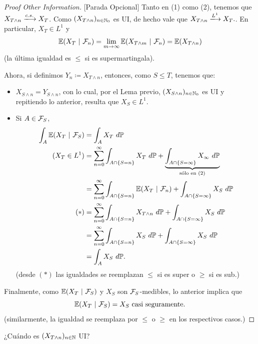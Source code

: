 \begin{proof}[Proof Other Information][Parada Opcional]
	Tanto en (1) como (2), tenemos que $X_{T \wedge n} \xlongrightarrow{c.s.} X_{T}$. Como $(X_{T \wedge n})_{n \in \mathbb{N}_{0}}$ es UI, de hecho vale que $X_{T \wedge n} \xlongrightarrow{L^{1}} X_{T}.$. En particular, $X_{T} \in L^{1}$ y 
	\[ \mathbb{E}(X_{T} \ | \ \mathcal{F}_{n}) = \lim_{m \to \infty} \mathbb{E}(X_{T \wedge m} \ | \ \mathcal{F}_{n}) = \mathbb{E}(X_{T \wedge n}) \]
	(la última igualdad es $\leq$ si es supermartingala). \par
	Ahora, si definimos $Y_{n} \coloneq X_{T \wedge n}$, entonces, como $S \leq T$, tenemos que:
	\begin{itemize}
		\item $X_{S \wedge n} = Y_{S \wedge n}$, con lo cual, por el Lema previo, $(X_{S \wedge n})_{n \in \mathbb{N}_{0}}$ es UI y repitiendo lo anterior, resulta que $X_{S} \in L^{1}$.

		\item Si $A \in \mathcal{F}_{S}$,
		\begin{align*}
			\int_{A} \mbb{E}(X_{T} \ | \ \mcal{F}_{S}) &= \int_{A} X_{T} \ d\mbb{P} \\
			(X_{T} \in L^{1}) &= \sum_{n=0}^{\infty} \int_{A \cap \{S = n\}} X_{T} \ d\mbb{P} + \underbrace{\int_{A \cap \{S = \infty\}} X_{\infty} \ d\mbb{P}}_{\text{sólo en (2)}} \\
			&= \sum_{n=0}^{\infty} \int_{A \cap \{S = n\}} \mbb{E}(X_{T} \ | \ \mcal{F}_{n}) + \int_{A \cap \{S = \infty\}} X_{S} \ d\mbb{P} \\
			(*) &= \sum_{n=0}^{\infty} \int_{A \cap \{S = n\}} X_{T \wedge n} \ d\mbb{P} + \int_{A \cap \{S = \infty\}} X_{S} \ d\mbb{P} \\
			&= \sum_{n=0}^{\infty} \int_{A \cap \{S = n\}} X_{S} \ d\mbb{P} + \int_{A \cap \{S = \infty\}} X_{S} \ d\mbb{P} \\
			&= \int_{A} X_{S} \ d\mbb{P}
		.\end{align*}
		(desde $(*)$ las igualdades se reemplazan $\leq$ si es super o $\geq$ si es sub.)
	\end{itemize}
	Finalmente, como $\mbb{E}(X_{T} \ | \ \mcal{F}_{S})$ y $X_{S}$ son $\mathcal{F}_{S}$-medibles, lo anterior implica que
	\[ \mbb{E}(X_{T} \ | \ \mcal{F}_{S}) = X_{S} \text{ casi seguramente}. \]
	(similarmente, la igualdad se reemplaza por $\leq$ o $\geq$ en los respectivos casos.)
\end{proof}

\begin{pregunta}
	¿Cuándo es $(X_{T \wedge n})_{n \in \mathbb{N}}$ UI?
\end{pregunta}

